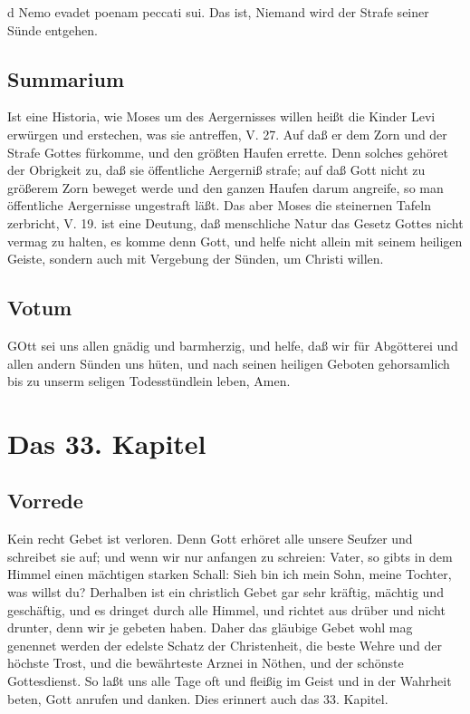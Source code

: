 d Nemo evadet poenam peccati sui. Das ist, Niemand wird der Strafe seiner Sünde entgehen.

\section{Summarium}

Ist eine Historia, wie Moses um des Aergernisses willen heißt die Kinder Levi erwürgen und erstechen, was sie antreffen, V. 27. Auf daß er dem Zorn und der Strafe Gottes fürkomme, und den größten Haufen errette. Denn solches gehöret der Obrigkeit zu, daß sie öffentliche Aergerniß strafe; auf daß Gott nicht zu größerem Zorn beweget werde und den ganzen
Haufen darum angreife, so man öffentliche Aergernisse ungestraft läßt. Das aber Moses die steinernen Tafeln zerbricht, V. 19. ist eine Deutung, daß menschliche Natur das Gesetz Gottes nicht vermag zu halten, es komme denn Gott, und helfe nicht allein mit seinem heiligen Geiste, sondern auch mit Vergebung der Sünden, um Christi willen.

\section{Votum}

GOtt sei uns allen gnädig und barmherzig, und helfe, daß wir für Abgötterei und allen andern Sünden uns hüten, und nach seinen heiligen Geboten gehorsamlich bis zu unserm seligen Todesstündlein leben, Amen.

\chapter{Das 33. Kapitel}

\section{Vorrede}

Kein recht Gebet ist verloren. Denn Gott erhöret alle unsere Seufzer und schreibet sie auf; und wenn wir nur anfangen zu schreien: Vater, so gibts in dem Himmel einen mächtigen starken Schall: Sieh bin ich mein Sohn, meine Tochter, was willst du? Derhalben ist ein christlich Gebet gar sehr kräftig, mächtig und geschäftig, und es dringet durch alle Himmel, und richtet aus drüber und nicht drunter, denn wir je gebeten haben. Daher das gläubige Gebet wohl mag genennet werden der edelste Schatz der Christenheit, die beste Wehre und der höchste Trost, und die bewährteste Arznei in Nöthen, und der schönste Gottesdienst. So laßt uns alle Tage oft und fleißig im Geist und in der Wahrheit beten, Gott anrufen und danken. Dies erinnert auch das 33. Kapitel.

